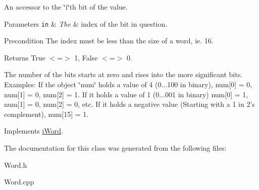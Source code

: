 An accessor to the \char`\"{}i\char`\"{}th bit of the value. 


\begin{DoxyParams}[1]{Parameters}
\mbox{\tt in}  & {\em The} & index of the bit in question. \\
\hline
\end{DoxyParams}
\begin{DoxyPrecond}{Precondition}
The index must be less than the size of a word, ie. 16. 
\end{DoxyPrecond}
\begin{DoxyReturn}{Returns}
True $<$=$>$ 1, False $<$=$>$ 0.
\end{DoxyReturn}
The number of the bits starts at zero and rises into the more significant bits. Examples: If the object \char`\"{}num\char`\"{} holds a value of 4 (0...100 in binary), num\mbox{[}0\mbox{]} = 0, num\mbox{[}1\mbox{]} = 0, num\mbox{[}2\mbox{]} = 1. If it holds a value of 1 (0...001 in binary) num\mbox{[}0\mbox{]} = 1, num\mbox{[}1\mbox{]} = 0, num\mbox{[}2\mbox{]} = 0, etc. If it holds a negative value (Starting with a 1 in 2's complement), num\mbox{[}15\mbox{]} = 1. 

Implements \hyperlink{classiWord_a2bd140904379329b74c3e1af83eb3a85}{iWord}.



The documentation for this class was generated from the following files:\begin{DoxyCompactItemize}
\item 
Word.h\item 
Word.cpp\end{DoxyCompactItemize}
